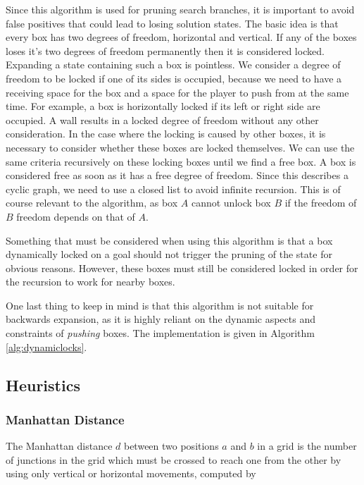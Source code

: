 \documentclass[a4paper,11pt]{article}
\begin{document}
Since this algorithm is used for pruning search branches, it is important to
avoid false positives that could lead to losing solution states. The basic idea
is that every box has two degrees of freedom, horizontal and vertical. If any of
the boxes loses it's two degrees of freedom permanently then it is considered
locked. Expanding a state containing such a box is pointless. We consider a
degree of freedom to be locked if one of its sides is occupied, because we need
to have a receiving space for the box and a space for the player to push from at
the same time. For example, a box is horizontally locked if its left or right
side are occupied. A wall results in a locked degree of freedom without any
other consideration. In the case where the locking is caused by other boxes, it
is necessary to consider whether these boxes are locked themselves. We can use
the same criteria recursively on these locking boxes until we find a free box. A
box is considered free as soon as it has a free degree of freedom. Since this
describes a cyclic graph, we need to use a closed list to avoid infinite
recursion. This is of course relevant to the algorithm, as box $A$ cannot
unlock box $B$ if the freedom of $B$ freedom depends on that of $A$.

Something that must be considered when using this algorithm is that a box
dynamically locked on a goal should not trigger the pruning of the state for
obvious reasons. However, these boxes must still be considered locked in order
for the recursion to work for nearby boxes.

One last thing to keep in mind is that this algorithm is not suitable for
backwards expansion, as it is highly reliant on the dynamic aspects and
constraints of \emph{pushing} boxes. The implementation is given in Algorithm
\ref{alg:dynamiclocks}.


\subsection{Heuristics}

\subsubsection{Manhattan Distance}

The Manhattan distance $d$ between two positions $a$ and $b$ in a grid is the
number of junctions in the grid which must be crossed to reach one from the
other by using only vertical or horizontal movements, computed by
\end{document}
